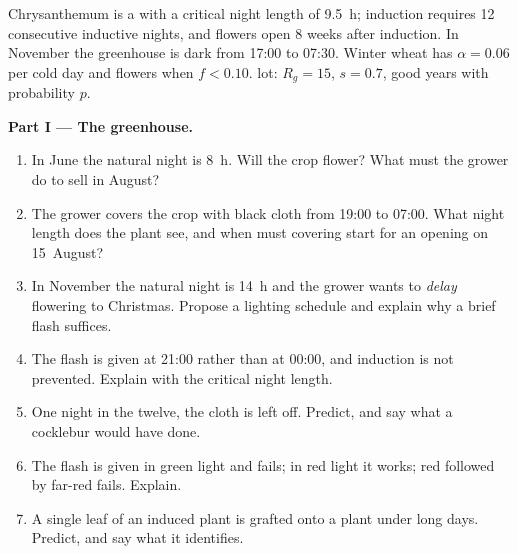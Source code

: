 \begin{problem}
\label{pb:b2:plant-flowering:1}
Chrysanthemum is a  with a critical night length of
\qty{9.5}{h}; induction requires \num{12} consecutive inductive
nights, and flowers open \num{8} weeks after induction. In November
the greenhouse is dark from 17:00 to 07:30. Winter wheat
has $\alpha = 0.06$ per cold day and flowers when $f < 0.10$. 
lot: $R_g = 15$, $s = 0.7$, good years with probability $p$.

\medskip
\noindent\textbf{Part I --- The greenhouse.}
\begin{enumerate}
  \item In June the natural night is \qty{8}{h}. Will the crop
        flower? What must the grower do to sell  in August?
  \item The grower covers the crop with black cloth from
        19:00 to 07:00. What night length does the
        plant see, and when must covering start for an opening on
        15~August?
  \item In November the natural night is \qty{14}{h} and the grower
        wants to \emph{delay} flowering to Christmas. Propose a
        lighting schedule and explain why a brief flash suffices.
  \item The flash is given at 21:00 rather than at
        00:00, and induction is not prevented. Explain with
        the critical night length.
  \item One night in the twelve, the cloth is left off. Predict, and
        say what a cocklebur would have done.
  \item The flash is given in green light and fails; in red light it
        works; red followed by far-red fails. Explain.
  \item A single leaf of an induced plant is grafted onto a plant
        under long days. Predict, and say what it identifies.
\end{enumerate}


\end{problem}
